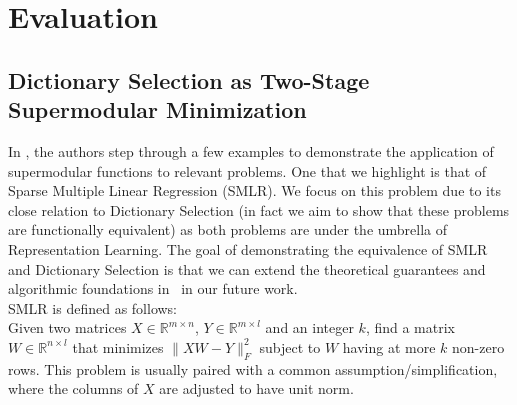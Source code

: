 \documentclass{article}
\newcommand{\R}{\mathbb{R}}
\begin{document}
\section{Evaluation}\label{sec:eval}

\subsection{Dictionary Selection as Two-Stage Supermodular Minimization} \label{supermodTwoStage}

In \cite{weaklyalpha}, the authors step through a few examples to demonstrate the application of supermodular functions to relevant problems. One that we highlight is that of Sparse Multiple Linear Regression (SMLR). We focus on this problem due to its close relation to Dictionary Selection (in fact we aim to show that these problems are functionally equivalent) as both problems are under the umbrella of Representation Learning. The goal of demonstrating the equivalence of SMLR and Dictionary Selection is that we can extend the theoretical guarantees and algorithmic foundations in~\cite{weaklyalpha} in our future work. 
\\

\noindent SMLR is defined as follows:\\
Given two matrices $X\in\R^{m\times n}$, $Y\in\R^{m\times l}$ and an integer $k$, find a matrix  $W\in\R^{n\times l}$ that minimizes $\|XW-Y\|^2_F$ subject to $W$ having at more $k$ non-zero rows. This problem is usually paired with a common assumption/simplification, where the columns of $X$ are adjusted to have unit norm.
\\
\end{document}
